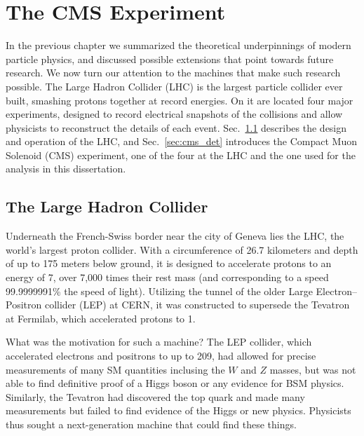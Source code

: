 \chapter{The CMS Experiment}

In the previous chapter we summarized the theoretical underpinnings of modern
particle physics, and discussed possible extensions that point towards
future research. We now turn our attention to the machines that make such
research possible. The Large Hadron Collider (LHC) is the largest
particle collider ever built, smashing protons together at record energies.
On it are located four major experiments, designed to record electrical
snapshots of the collisions and allow physicists to reconstruct the details
of each event. Sec.~\ref{sec:lhc} describes the design and operation of the LHC,
and Sec.~\ref{sec:cms_det} introduces the Compact Muon Solenoid (CMS) experiment,
one of the four at the LHC and the one used for the analysis in this dissertation.

\section{The Large Hadron Collider}
\label{sec:lhc}

Underneath the French-Swiss border near the city of Geneva lies the LHC, the world's largest 
proton collider. With a circumference of 26.7 kilometers and depth of up to 175
meters below ground, it is designed to accelerate protons to an energy of 7\TeV, over
7,000 times their rest mass (and corresponding to a speed 
99.9999991\% the speed of light). Utilizing the tunnel of the older Large Electron--Positron
collider (LEP) at CERN, it was constructed to supersede the Tevatron at Fermilab, which
accelerated protons to 1\TeV.

What was the motivation for such a machine? The LEP collider, which accelerated electrons
and positrons to up to 209\GeV, had allowed for precise measurements of many SM quantities
inclusing the $W$ and $Z$ masses, but was not able to find definitive proof of a Higgs boson
or any evidence for BSM physics. Similarly, the Tevatron had discovered the top quark
and made many measurements but failed to find evidence of the Higgs or new physics. Physicists
thus sought a next-generation machine that could find these things.

